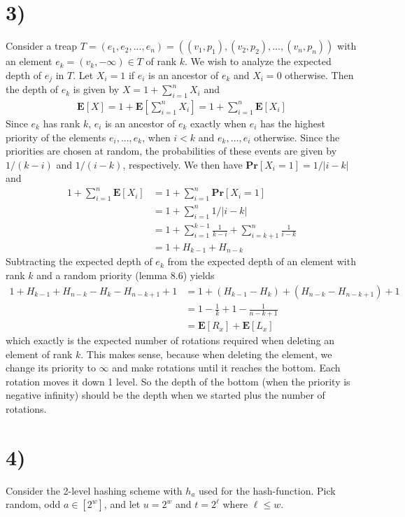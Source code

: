 \documentclass[12pt]{article}
\begin{document}
\section*{3)}
Consider a treap $T=(e_1, e_2, ..., e_n) = ((v_1,p_1), (v_2,p_2), ..., (v_n,p_n))$ with an element $e_k = (v_k, -\infty) \in T$ of rank $k$. We wish to analyze the expected depth of $e_j$ in $T$. Let $X_i = 1$ if $e_i$ is an ancestor of $e_k$ and $X_i=0$ otherwise. Then the depth of $e_k$ is given by $X=1 + \sum_{i=1}^{n}X_i$ and
\begin{align*}
\mathbf{E}\left[ X \right] = 1 + \mathbf{E}\left[ \sum\limits_{i=1}^{n}X_i \right] = 1 + \sum\limits_{i=1}^{n}\mathbf{E}\left[X_i \right] 
\end{align*}
Since $e_k$ has rank $k$, $e_i$ is an ancestor of $e_k$ exactly when $e_i$ has the highest priority of the elements $e_i, ..., e_k$, when $i < k$ and $e_k, ..., e_i$ otherwise. Since the priorities are chosen at random, the probabilities of these events are given by $1/(k-i)$ and $1/(i-k)$, respectively. We then have $\mathbf{Pr}\left[ X_i = 1 \right] = 1 / |i-k|$ and
\begin{align*}
1 + \sum\limits_{i=1}^{n}\mathbf{E}\left[X_i \right] &= 1 + \sum\limits_{i=1}^{n}\mathbf{Pr}\left[X_i = 1 \right] \\
&= 1 + \sum\limits_{i=1}^{n} 1 / |i-k| \\
&= 1 +\sum\limits_{i=1}^{k-1} \frac{1}{k-i} + \sum\limits_{i=k+1}^{n} \frac{1}{i-k} \\
&= 1 +H_{k-1} + H_{n-k}
\end{align*}
Subtracting the expected depth of $e_k$ from the expected depth of an element with rank $k$ and a random priority (lemma 8.6) yields
\begin{align*}
1 + H_{k-1} + H_{n-k} - H_k - H_{n-k+1} + 1 &= 1 + (H_{k-1} - H_k) + (H_{n-k} - H_{n-k+1}) + 1 \\
&= 1 -\frac{1}{k} +1 - \frac{1}{n-k+1} \\
&= \mathbf{E}\left[ R_x \right] + \mathbf{E}\left[ L_x \right]
\end{align*}
which exactly is the expected number of rotations required when deleting an element of rank $k$. This makes sense, because when deleting the element, we change its priority to $\infty$ and make rotations until it reaches the bottom. Each rotation moves it down 1 level. So the depth of the bottom (when the priority is negative infinity) should be the depth when we started plus the number of rotations.


\section*{4)}
Consider the 2-level hashing scheme with $h_a$ used for the hash-function. Pick random, odd $a \in [2^w]$, and let $u = 2^w$ and $t = 2^\ell$ where $\ell \leq w$.
\end{document}
